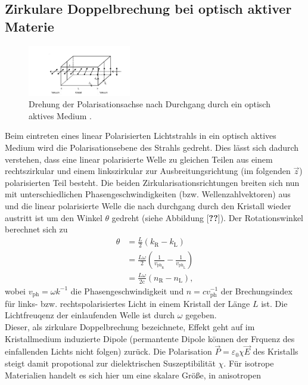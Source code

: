 \subsection{Zirkulare Doppelbrechung bei optisch aktiver Materie}
\begin{figure}[H]
  \center
  \includegraphics[width=0.4\textwidth]{Bilder/Kristall.jpg}
  \caption{Drehung der Polarisationsachse nach Durchgang durch ein optisch
  aktives Medium \cite{Anleitung}.}
  \label{T_Abb:2}
\end{figure}
Beim eintreten eines linear Polarisierten Lichtstrahls in ein optisch aktives Medium
wird die Polarisationsebene des Strahls gedreht. Dies lässt sich dadurch verstehen,
dass eine linear polarisierte Welle zu gleichen Teilen aus einem rechtszirkular und
einem linkszirkular zur Ausbreitungsrichtung (im folgenden $\vec{z}$) polarisierten
Teil besteht. Die beiden Zirkularisationsrichtungen breiten sich nun mit unterschiedlichen
Phasengeschwindigkeiten (bzw. Wellenzahlvektoren) aus und die linear polarisierte
Welle die nach durchgang durch den Kristall wieder austritt ist um den Winkel $\theta$
gedreht (siehe Abbildung [\textbf{??}]). Der Rotationswinkel berechnet sich zu
\begin{align*}
    \theta &=\frac{L}{2} \left(k_{\text{R}}-k_{\text{L}}\right)\\
          &=\frac{L\omega}{2}\left(\frac{1}{v_{\text{ph}_{\text{R}}}}-\frac{1}{v_{\text{ph}_{\text{L}}}}\right)\\
          &=\frac{L\omega}{2\text{c}}\left(n_{\text{R}}-n_{\text{L}}\right),
\end{align*}
wobei $v_{\text{ph}}=\omega k^{-1}$ die Phasengeschwindigkeit und $n=c v_{\text{ph}}^{-1}$
der Brechungsindex für links- bzw. rechtspolarisiertes Licht in einem Kristall der
Länge $L$ ist. Die Lichtfreuqenz der einlaufenden Welle ist durch $\omega$ gegeben.\\
Dieser, als zirkulare Doppelbrechung bezeichnete, Effekt geht auf im Kristallmedium induzierte
Dipole (permantente Dipole können der Frquenz des einfallenden Lichts nicht folgen) zurück.
Die Polarisation $\vec{P} = \varepsilon_0 \chi \vec{E}$ des Kristalls
steigt damit propotional zur dielektrischen Suszeptibilität
$\chi$. Für isotrope Materialien handelt es sich hier um eine skalare Größe, in anisotropen
